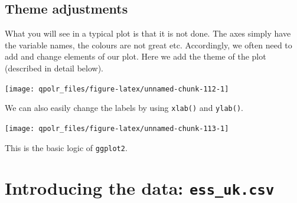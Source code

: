 \documentclass[12pt,oneside]{reedthesis}
\theoremstyle{definition}
\theoremstyle{definition}
\theoremstyle{definition}
\theoremstyle{remark}
\begin{document}
  \subsection{Theme adjustments}\label{theme-adjustments}
  
  What you will see in a typical plot is that it is not done. The axes
  simply have the variable names, the colours are not great etc.
  Accordingly, we often need to add and change elements of our plot. Here
  we add the theme of the plot (described in detail below).
  \begin{Shaded}
  \begin{Highlighting}[]
  \NormalTok{(}\OperatorTok{+}
  \StringTok{  }\NormalTok{() }\OperatorTok{+}
  \StringTok{  }\NormalTok{()}
  \end{Highlighting}
  \end{Shaded}
  \begin{center}\texttt{[image: qpolr\_files/figure-latex/unnamed-chunk-112-1]} \end{center}
  
  We can also easily change the labels by using \texttt{xlab()} and
  \texttt{ylab()}.
  \begin{Shaded}
  \end{Shaded}
  \begin{center}\texttt{[image: qpolr\_files/figure-latex/unnamed-chunk-113-1]} \end{center}
  
  This is the basic logic of \texttt{ggplot2}.
  
  \section{\texorpdfstring{Introducing the data:
  \texttt{ess\_uk.csv}}{Introducing the data: ess\_uk.csv}}\label{introducing-the-data-ess_uk.csv}
  
\end{document}
